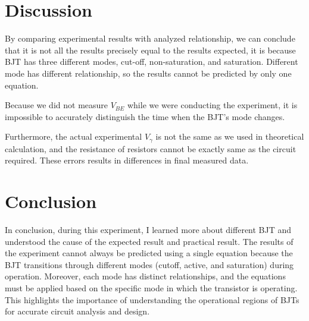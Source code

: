 \section{Discussion}
By comparing experimental results with analyzed relationship, we can conclude that it is not all the results precisely equal to the results expected, it is because BJT has three different modes, cut-off, non-saturation, and saturation. Different mode has different relationship, so the results cannot be predicted by only one equation.\par
Because we did not measure $V_{BE}$ while we were conducting the experiment, it is impossible to accurately distinguish the time when the BJT's mode changes.\par
Furthermore, the actual experimental $V_\gamma$ is not the same as we used in theoretical calculation, and the resistance of resistors cannot be exactly same as the circuit required. These errors results in differences in final measured data.

\section{Conclusion}
In conclusion, during this experiment, I learned more about different BJT and understood the cause of the expected result and practical result. The results of the experiment cannot always be predicted using a single equation because the BJT transitions through different modes (cutoff, active, and saturation) during operation. Moreover, each mode has distinct relationships, and the equations must be applied based on the specific mode in which the transistor is operating. This highlights the importance of understanding the operational regions of BJTs for accurate circuit analysis and design.